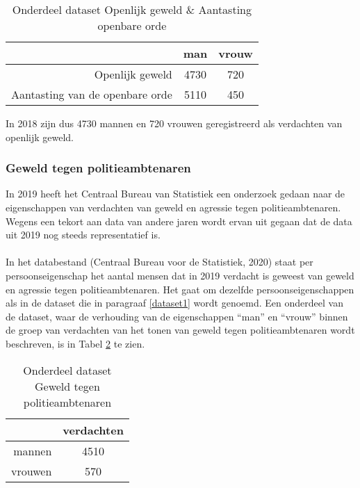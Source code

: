 \documentclass[12pt, letterpaper]{article}
\begin{document}
\begin{table}[h]
\begin{center}
\caption{Onderdeel dataset Openlijk geweld \& Aantasting openbare orde}
 \begin{tabular}{|r|c c|} 
 \hline
  & man & vrouw \\ 
 \hline\hline
 Openlijk geweld & 4730 & 720 \\ 
 \hline
 Aantasting van de openbare orde & 5110 & 450 \\
 \hline
\end{tabular}
\label{CBS01}
\end{center}
\end{table}
 
\noindent In 2018 zijn dus 4730 mannen en 720 vrouwen geregistreerd als verdachten van openlijk geweld.

\subsubsection{Geweld tegen politieambtenaren}
In 2019 heeft het Centraal Bureau van Statistiek een onderzoek gedaan naar de eigenschappen van verdachten van geweld en agressie tegen politieambtenaren. Wegens een tekort aan data van andere jaren wordt ervan uit gegaan dat de data uit 2019 nog steeds representatief is. \\ \\
In het databestand (Centraal Bureau voor de Statistiek, 2020) staat per persoonseigenschap het aantal mensen dat in 2019 verdacht is geweest van geweld en agressie tegen politieambtenaren. Het gaat om dezelfde persoonseigenschappen als in de dataset die in paragraaf \ref{dataset1} wordt genoemd. Een onderdeel van de dataset, waar de verhouding van de eigenschappen ``man'' en ``vrouw'' binnen de groep van verdachten van het tonen van geweld tegen politieambtenaren wordt beschreven, is in Tabel \ref{CBS02} te zien. 

\begin{table}[h]
\begin{center}
\caption{Onderdeel dataset Geweld tegen politieambtenaren}
 \begin{tabular}{|r|c|} 
 \hline
  & verdachten\\ 
 \hline\hline
 mannen & 4510 \\ 
 \hline
 vrouwen & 570 \\
 \hline
\end{tabular}
\label{CBS02}
\end{center}
\end{table}
 
\end{document}
